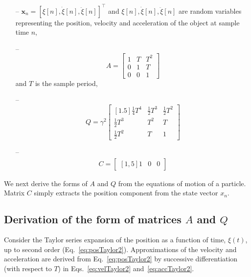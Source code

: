 \documentclass[fleqn,12pt]{article}
\begin{document}
\begin{itemize}

    \item[--]
        $\mathbf{x}_n=\left[\xi[n],\dot{\xi}[n],\ddot{\xi}[n]\right]^\intercal$
        and $\xi[n],\dot{\xi}[n],\ddot{\xi}[n]$ are random variables representing
        the position, velocity and acceleration of the object at sample time
        $n$,

    \item[--]
        \begin{equation}
            A=\begin{bmatrix}
                1 & T & T^2\\
                0 & 1 & T\\
                0 & 0 & 1
            \end{bmatrix}
            \label{eq:A}
        \end{equation}
        and $T$ is the sample period,

    \item[--]
        \begin{equation}
            Q=\gamma^2\begin{bmatrix}[1.5]
                \frac{1}{4}T^4&\frac{1}{2}T^3&\frac{1}{2}T^2\\
                \frac{1}{2}T^3&T^2&T\\
                \frac{1}{2}T^2&T&1
            \end{bmatrix}
            \label{eq:Q}
        \end{equation}

    \item[--]
        \begin{align*}
            C=\begin{bmatrix}[1,5]
                1 & 0 &0
            \end{bmatrix}
        \end{align*}
\end{itemize}

We next derive the forms of $A$ and $Q$ from the equations of motion of a
particle. Matrix $C$ simply extracts the position component from the state
vector $x_n$.

\subsection*{Derivation of the form of matrices $A$ and $Q$}

Consider the Taylor series expansion of the position as a function of time,
$\xi(t)$, up to second order (Eq.~\ref{eq:posTaylor2}). Approximations of the
velocity and acceleration are derived from Eq.~\ref{eq:posTaylor2} by
successive differentiation (with respect to $T$) in Eqs.~\ref{eq:velTaylor2}
and~\ref{eq:accTaylor2}.
\end{document}
